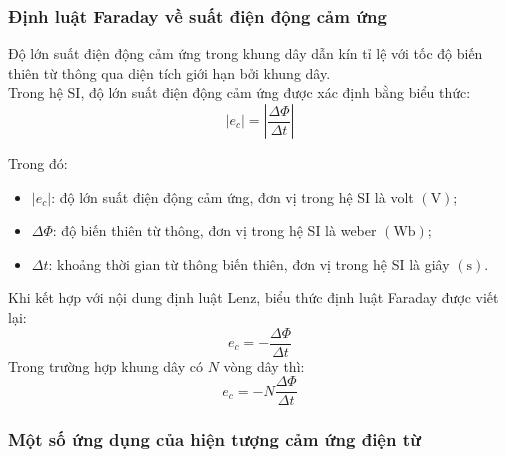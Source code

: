 \begin{tomtat}
	\subsubsection{Định luật Faraday về suất điện động cảm ứng}
	\begin{dl}
		Độ lớn suất điện động cảm ứng trong khung dây dẫn kín tỉ lệ với tốc độ biến thiên từ thông qua diện tích giới hạn bởi khung dây.\\
		Trong hệ SI, độ lớn suất điện động cảm ứng được xác định bằng biểu thức:
		\begin{equation}
			\left|e_c\right|=\left|\dfrac{\Delta \Phi}{\Delta t}\right|
		\end{equation}
	\end{dl}
	Trong đó:
	\begin{itemize}
		\item $\left|e_c\right|$: độ lớn suất điện động cảm ứng, đơn vị trong hệ SI là volt $\left(\si{\volt}\right)$;
		\item $\Delta\Phi$: độ biến thiên từ thông, đơn vị trong hệ SI là weber $\left(\si{\weber}\right)$;
		\item $\Delta t$: khoảng thời gian từ thông biến thiên, đơn vị trong hệ SI là giây $\left(\si{\second}\right)$.
	\end{itemize}
	\begin{luuy}
		Khi kết hợp với nội dung định luật Lenz, biểu thức định luật Faraday được viết lại:
		\begin{equation}
			e_c=-\dfrac{\Delta \Phi}{\Delta t}
		\end{equation}
		Trong trường hợp khung dây có $N$ vòng dây thì:
		\begin{equation}
			e_c=-N\dfrac{\Delta \Phi}{\Delta t}
		\end{equation}
	\end{luuy}
	\subsubsection{Một số ứng dụng của hiện tượng cảm ứng điện từ}

\end{tomtat}
